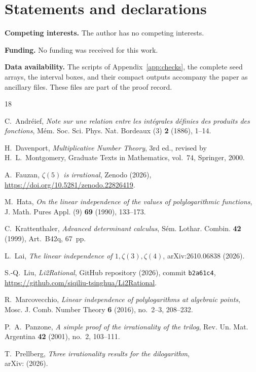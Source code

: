 \documentclass{amsart}
\theoremstyle{remark}
\numberwithin{equation}{section}
\numberwithin{table}{section}
\begin{document}
\section*{Statements and declarations}

\textbf{Competing interests.} The author has no competing interests.

\textbf{Funding.} No funding was received for this work.

\textbf{Data availability.} The scripts of Appendix~\ref{app:checks}, the
complete seed arrays, the interval boxes, and their compact outputs accompany
the paper as ancillary files. These files are part of the proof record.

\begin{thebibliography}{18}

C.~Andr\'eief, \emph{Note sur une relation entre les int\'egrales d\'efinies
des produits des fonctions}, M\'em. Soc. Sci. Phys. Nat. Bordeaux (3)
\textbf{2} (1886), 1--14.

H.~Davenport, \emph{Multiplicative Number Theory}, 3rd ed., revised by
H.~L.~Montgomery, Graduate Texts in Mathematics, vol.~74, Springer, 2000.

A.~Fauzan, \emph{$\zeta(5)$ is irrational}, Zenodo (2026),
\url{https://doi.org/10.5281/zenodo.22826419}.

M.~Hata, \emph{On the linear independence of the values of polylogarithmic
functions}, J. Math. Pures Appl. (9) \textbf{69} (1990), 133--173.

C.~Krattenthaler, \emph{Advanced determinant calculus}, S\'em. Lothar.
Combin. \textbf{42} (1999), Art.~B42q, 67~pp.

L.~Lai, \emph{The linear independence of $1,\zeta(3),\zeta(4)$},
arXiv:2610.06838 (2026).

S.-Q.~Liu, \emph{Li2Rational}, GitHub repository (2026), commit
\texttt{b2a61c4}, \url{https://github.com/siqiliu-tsinghua/Li2Rational}.

R.~Marcovecchio, \emph{Linear independence of polylogarithms at algebraic
points}, Mosc. J. Comb. Number Theory \textbf{6} (2016), no.~2--3, 208--232.

P.~A.~Panzone, \emph{A simple proof of the irrationality of the trilog},
Rev. Un. Mat. Argentina \textbf{42} (2001), no.~2, 103--111.

T.~Prellberg, \emph{Three irrationality results for the dilogarithm},\\
arXiv: (2026).


\end{thebibliography}
\end{document}
